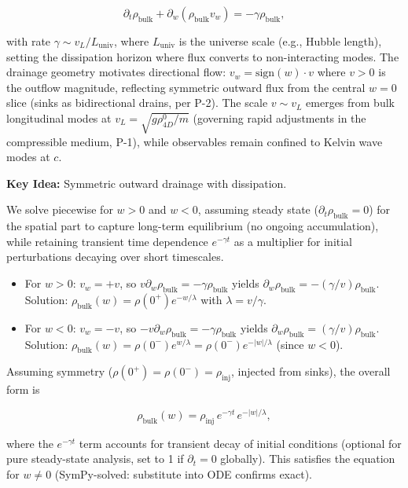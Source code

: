 \begin{equation}
\partial_t \rho_{\text{bulk}} + \partial_w (\rho_{\text{bulk}} v_w) = -\gamma \rho_{\text{bulk}},
\end{equation}

with rate $\gamma \sim v_L / L_{\text{univ}}$, where $L_{\text{univ}}$ is the universe scale (e.g., Hubble length), setting the dissipation horizon where flux converts to non-interacting modes. The drainage geometry motivates directional flow: $v_w = \text{sign}(w) \cdot v$ where $v > 0$ is the outflow magnitude, reflecting symmetric outward flux from the central $w=0$ slice (sinks as bidirectional drains, per P-2). The scale $v \sim v_L$ emerges from bulk longitudinal modes at $v_L = \sqrt{g \rho_{4D}^0 / m}$ (governing rapid adjustments in the compressible medium, P-1), while observables remain confined to Kelvin wave modes at $c$.

\textbf{Key Idea:} Symmetric outward drainage with dissipation.

We solve piecewise for $w > 0$ and $w < 0$, assuming steady state ($\partial_t \rho_{\text{bulk}} = 0$) for the spatial part to capture long-term equilibrium (no ongoing accumulation), while retaining transient time dependence $e^{-\gamma t}$ as a multiplier for initial perturbations decaying over short timescales.

\begin{itemize}
\item For $w > 0$: $v_w = +v$, so $v \partial_w \rho_{\text{bulk}} = -\gamma \rho_{\text{bulk}}$ yields $\partial_w \rho_{\text{bulk}} = -(\gamma / v) \rho_{\text{bulk}}$. Solution: $\rho_{\text{bulk}}(w) = \rho(0^+) e^{-w / \lambda}$ with $\lambda = v / \gamma$.
\item For $w < 0$: $v_w = -v$, so $-v \partial_w \rho_{\text{bulk}} = -\gamma \rho_{\text{bulk}}$ yields $\partial_w \rho_{\text{bulk}} = (\gamma / v) \rho_{\text{bulk}}$. Solution: $\rho_{\text{bulk}}(w) = \rho(0^-) e^{w / \lambda} = \rho(0^-) e^{-|w| / \lambda}$ (since $w < 0$).
\end{itemize}

Assuming symmetry ($\rho(0^+) = \rho(0^-) = \rho_{\text{inj}}$, injected from sinks), the overall form is

\begin{equation}
\rho_{\text{bulk}}(w) = \rho_{\text{inj}} \, e^{-\gamma t} \, e^{-|w| / \lambda},
\end{equation}

where the $e^{-\gamma t}$ term accounts for transient decay of initial conditions (optional for pure steady-state analysis, set to 1 if $\partial_t = 0$ globally). This satisfies the equation for $w \neq 0$ (SymPy-solved: substitute into ODE confirms exact).

